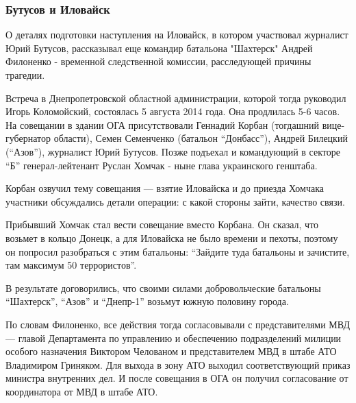  
 
 

\subsubsection{Бутусов и Иловайск}

О деталях подготовки наступления на Иловайск, в котором участвовал журналист
Юрий Бутусов, рассказывал еще командир батальона "Шахтерск" Андрей
Филоненко
- временной следственной комиссии, расследующей причины трагедии.

Встреча в Днепропетровской областной администрации, которой тогда
руководил Игорь Коломойский, состоялась 5 августа 2014 года. Она
продлилась 5-6 часов. На совещании в здании ОГА присутствовали Геннадий
Корбан (тогдашний вице-губернатор области), Семен Семенченко (батальон
\enquote{Донбасс}), Андрей Билецкий (\enquote{Азов}), журналист Юрий Бутусов. Позже
подъехал и командующий в секторе \enquote{Б} генерал-лейтенант Руслан Хомчак -
ныне глава украинского генштаба.

Корбан озвучил тему совещания --- взятие Иловайска и до приезда Хомчака
участники обсуждались детали операции: с какой стороны зайти, качество
связи.

Прибывший Хомчак стал вести совещание вместо Корбана. Он сказал, что
возьмет в кольцо Донецк, а для Иловайска не было времени и пехоты, поэтому
он попросил разобраться с этим батальоны: \enquote{Зайдите туда батальоны и
зачистите, там максимум 50 террористов}.

В результате договорились, что своими силами добровольческие батальоны
\enquote{Шахтерск}, \enquote{Азов} и \enquote{Днепр-1} возьмут южную половину города.

По словам Филоненко, все действия тогда согласовывали с представителями
МВД --- главой Департамента по управлению и обеспечению подразделений
милиции особого назначения Виктором Челованом и представителем МВД в штабе
АТО Владимиром Гриняком. Для выхода в зону АТО выходил соответствующий
приказ министра внутренних дел. И после совещания в ОГА он получил
согласование от координатора от МВД в штабе АТО.

